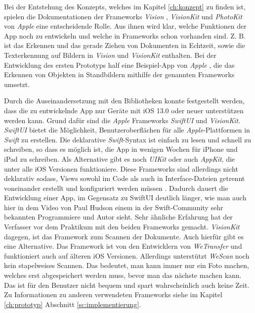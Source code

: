 \documentclass[nomenclature, oneside, 150]{HSMW-Thesis}
\begin{document}
		Bei der Entstehung des Konzepts, welches im Kapitel \ref{ch:konzept} zu finden ist, spielen die Dokumentationen der Frameworks \textit{Vision} , \textit{VisionKit} und \textit{PhotoKit} von \textit{Apple} eine entscheidende Rolle. Aus ihnen wird klar, welche Funktionen der App noch zu entwickeln und welche in Frameworks schon vorhanden sind. Z. B. ist das Erkennen und das gerade Ziehen von Dokumenten in Echtzeit, sowie die Texterkennung auf Bildern in \textit{Vision} und \textit{VisionKit} enthalten. Bei der Entwicklung des ersten Prototyps half eine Beispiel-App von \textit{Apple} \cite{noauthor_detecting_nodate}, die das Erkennen von Objekten in Standbildern mithilfe der genannten Frameworks umsetzt.
		
		Durch die Auseinandersetzung mit den Bibliotheken konnte festgestellt werden, dass die zu entwickelnde App nur Geräte mit iOS 13.0 oder neuer unterstützen werden kann. Grund dafür sind die \textit{Apple} Frameworks \textit{SwiftUI} und \textit{VisionKit}. \textit{SwiftUI} bietet die Möglichkeit, Benutzeroberflächen für alle \textit{Apple}-Plattformen in \textit{Swift} zu erstellen. Die deklarative \textit{Swift}-Syntax ist einfach zu lesen und schnell zu schreiben, so dass es möglich ist, die App in wenigen Wochen für iPhone und iPad zu schreiben. Als Alternative gibt es noch \textit{UIKit} oder auch \textit{AppKit}, die unter alle iOS Versionen funktioniere. Diese Frameworks sind allerdings nicht deklarativ sodass, Views sowohl im Code als auch in Interface-Dateien getrennt voneinander erstellt und konfiguriert werden müssen \cite{sillmann_einstieg_nodate}. Dadurch dauert die Entwicklung einer App, im Gegensatz zu SwiftUI deutlich länger, wie man auch hier in dem Video  von Paul Hudson einem in der Swift-Community sehr bekannten Programmiere und Autor sieht. Sehr ähnliche Erfahrung hat der Verfasser vor dem Praktikum mit den beiden Frameworks gemacht. \textit{VisionKit} dagegen, ist das Framework zum Scannen der Dokumente. Auch hierfür gibt es eine Alternative. Das Framework ist von den Entwicklern von \textit{WeTransfer} und funktioniert auch auf älteren iOS Versionen. Allerdings unterstützt \textit{WeScan} noch kein stapelweises Scannen. Das bedeutet, man kann immer nur ein Foto machen, welches erst abgespeichert werden muss, bevor man das nächste machen kann. Das ist für den Benutzer nicht bequem und spart wahrscheinlich auch keine Zeit. Zu Informationen zu anderen verwendeten Frameworks siehe im Kapitel \ref{ch:prototyp} Abschnitt \ref{sc:implementierung}.
\end{document}
